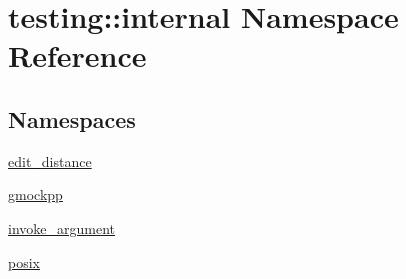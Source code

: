\hypertarget{namespacetesting_1_1internal}{}\section{testing\+::internal Namespace Reference}
\label{namespacetesting_1_1internal}
\subsection*{Namespaces}
\begin{DoxyCompactItemize}
\item 
 \mbox{\hyperlink{namespacetesting_1_1internal_1_1edit__distance}{edit\+\_\+distance}}
\item 
 \mbox{\hyperlink{namespacetesting_1_1internal_1_1gmockpp}{gmockpp}}
\item 
 \mbox{\hyperlink{namespacetesting_1_1internal_1_1invoke__argument}{invoke\+\_\+argument}}
\item 
 \mbox{\hyperlink{namespacetesting_1_1internal_1_1posix}{posix}}
\end{DoxyCompactItemize}
